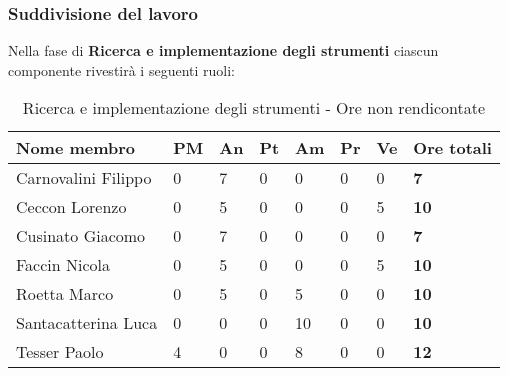 		\subsubsection{Suddivisione del lavoro} %
		\label{ssub:suddivisione_del_lavoro}
		Nella fase di \textbf{Ricerca e implementazione degli strumenti} ciascun componente rivestirà i seguenti ruoli: \\
			\begin{table}[!ht]
				\begin{center}
					\begin{tabularx}{0.9\textwidth}{|l|l|l|l|l|l|l|X|}
						\hline
						\textbf{Nome membro} & \textbf{PM} & \textbf{An} & \textbf{Pt} & \textbf{Am} & \textbf{Pr} & \textbf{Ve} & \textbf{Ore totali} \\
						\hline
						Carnovalini Filippo & 0 & 7 & 0 & 0 & 0 & 0 & \textbf{7} \\
						\hline
						Ceccon Lorenzo & 0 & 5 & 0 & 0 & 0 & 5 & \textbf{10} \\
						\hline
						Cusinato Giacomo & 0 & 7 & 0 & 0 & 0 & 0 & \textbf{7} \\
						\hline
						Faccin Nicola & 0 & 5 & 0 & 0 & 0 & 5 & \textbf{10} \\
						\hline
						Roetta Marco & 0 & 5 & 0 & 5 & 0 & 0 & \textbf{10} \\
						\hline
						Santacatterina Luca & 0 & 0 & 0 & 10 & 0 & 0 & \textbf{10} \\
						\hline
						Tesser Paolo & 4 & 0 & 0 & 8 & 0 & 0 & \textbf{12} \\
						\hline
					\end{tabularx}
				\end{center}
			\caption{Ricerca e implementazione degli strumenti - Ore non rendicontate}
			\end{table}
			

